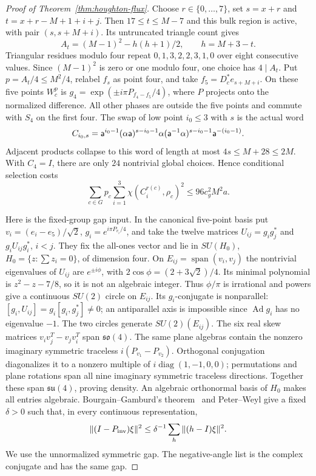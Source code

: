 \begin{proof}[Proof of Theorem~\ref{thm:houghton-flux}]
Choose $r\in\{0,\ldots,7\}$, set $s=x+r$ and
$t=x+r-M+1+i+j$. Then $17\leq t\leq M-7$ and this bulk
region is active, with pair $(s,s+M+i)$.
Its untruncated triangle count gives
\[
 A_t=(M-1)^2-h(h+1)/2,\qquad h=M+3-t.
\]
Triangular residues modulo four repeat $0,1,3,2,2,3,1,0$ over
eight consecutive values. Since $(M-1)^2$ is zero or one modulo
four, one choice has $4\mid A_t$.
Put $p=A_t/4\leq M^2/4$, relabel $f_s$ as point four, and take
$f_5=D_c^*e_{s+M+i}$. On these five points $W_c^p$ is
$g_4=\exp(\pm i\pi P_{f_4-f_5}/4)$, where $P$ projects onto
the normalized difference. All other phases are outside the five
points and commute with $S_4$ on the first four.
The swap of low point $i_0\leq3$ with $s$ is the actual word
\[
 C_{i_0,s}=\mathsf a^{i_0-1}(\alpha\mathsf a)^{s-i_0-1}\alpha
       (\mathsf a^{-1}\alpha)^{s-i_0-1}\mathsf a^{-(i_0-1)}.
\]
Adjacent products collapse to this word of length at most
$4s\leq M+28\leq2M$. With $C_4=I$, there are only $24$
nontrivial global choices. Hence conditional selection costs
\begin{equation}\label{eq:houghton-word-congestion}
 \sum_{c\in G}p_c\sum_{i=1}^3\chi(C_i^{r(c)},\rho_c)^2
       \leq96c_g^2M^2a.
\end{equation}

Here is the fixed-group gap input. In the canonical five-point basis
put $v_i=(e_i-e_5)/\sqrt2$, $g_i=e^{i\pi P_{v_i}/4}$,
and take the twelve matrices $U_{ij}=g_ig_j^*$ and
$g_iU_{ij}g_i^*$, $i<j$. They fix the all-ones vector and lie
in $SU(H_0)$, $H_0=\{z:\sum z_i=0\}$, of dimension four.
On $E_{ij}=\operatorname{span}(v_i,v_j)$ the nontrivial
eigenvalues of $U_{ij}$ are $e^{\pm i\phi}$, with
$2\cos\phi=(2+3\sqrt2)/4$. Its minimal polynomial is
$z^2-z-7/8$, so it is not an algebraic integer.
Thus $\phi/\pi$ is irrational and powers give a continuous
$SU(2)$ circle on $E_{ij}$. Its $g_i$-conjugate is nonparallel:
$[g_i,U_{ij}]=g_i[g_i,g_j^*]\neq0$; an antiparallel axis is
impossible since $\operatorname{Ad}g_i$ has no eigenvalue $-1$.
The two circles generate $SU(2)(E_{ij})$.
The six real skew matrices $v_iv_j^T-v_jv_i^T$ span
$\mathfrak{so}(4)$. The same plane algebras contain the nonzero
imaginary symmetric traceless $i(P_{v_1}-P_{v_2})$.
Orthogonal conjugation diagonalizes it to a nonzero multiple of
$i\operatorname{diag}(1,-1,0,0)$; permutations and plane rotations
span all nine imaginary symmetric traceless directions.
Together these span $\mathfrak{su}(4)$, proving density.
An algebraic orthonormal basis of $H_0$ makes all entries algebraic.
Bourgain--Gamburd's theorem~\cite[Theorem~1]{BourgainGamburd2012}
and Peter--Weyl give a fixed $\delta>0$ such that, in every
continuous representation,
\[
 \|(I-P_{\rm inv})\xi\|^2
       \leq\delta^{-1}\sum_h\|(h-I)\xi\|^2.
\]
We use the unnormalized symmetric gap. The negative-angle list is
the complex conjugate and has the same gap.


\end{proof}
